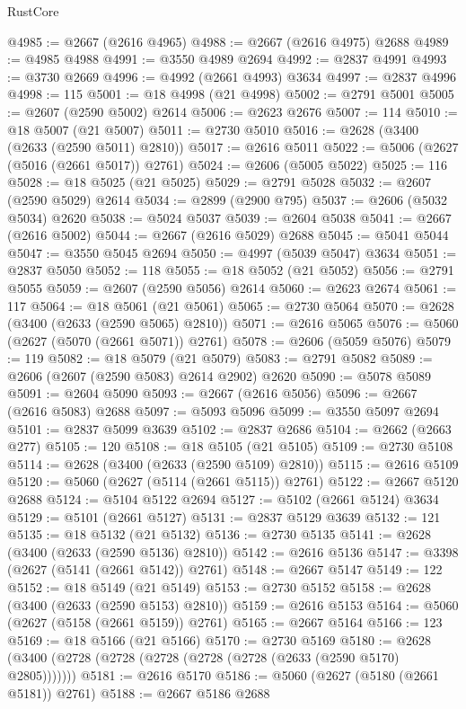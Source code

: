 \begin{lexlean}{RustCore}
\begin{coremodule}
@4985 := @2667 (@2616 @4965)
@4988 := @2667 (@2616 @4975) @2688
@4989 := @4985 @4988
@4991 := @3550 @4989 @2694
@4992 := @2837 @4991
@4993 := @3730 @2669
@4996 := @4992 (@2661 @4993) @3634
@4997 := @2837 @4996
@4998 := 115
@5001 := @18 @4998 (@21 @4998)
@5002 := @2791 @5001
@5005 := @2607 (@2590 @5002) @2614
@5006 := @2623 @2676
@5007 := 114
@5010 := @18 @5007 (@21 @5007)
@5011 := @2730 @5010
@5016 := @2628 (@3400 (@2633 (@2590 @5011) @2810))
@5017 := @2616 @5011
@5022 := @5006 (@2627 (@5016 (@2661 @5017)) @2761)
@5024 := @2606 (@5005 @5022)
@5025 := 116
@5028 := @18 @5025 (@21 @5025)
@5029 := @2791 @5028
@5032 := @2607 (@2590 @5029) @2614
@5034 := @2899 (@2900 @795)
@5037 := @2606 (@5032 @5034) @2620
@5038 := @5024 @5037
@5039 := @2604 @5038
@5041 := @2667 (@2616 @5002)
@5044 := @2667 (@2616 @5029) @2688
@5045 := @5041 @5044
@5047 := @3550 @5045 @2694
@5050 := @4997 (@5039 @5047) @3634
@5051 := @2837 @5050
@5052 := 118
@5055 := @18 @5052 (@21 @5052)
@5056 := @2791 @5055
@5059 := @2607 (@2590 @5056) @2614
@5060 := @2623 @2674
@5061 := 117
@5064 := @18 @5061 (@21 @5061)
@5065 := @2730 @5064
@5070 := @2628 (@3400 (@2633 (@2590 @5065) @2810))
@5071 := @2616 @5065
@5076 := @5060 (@2627 (@5070 (@2661 @5071)) @2761)
@5078 := @2606 (@5059 @5076)
@5079 := 119
@5082 := @18 @5079 (@21 @5079)
@5083 := @2791 @5082
@5089 := @2606 (@2607 (@2590 @5083) @2614 @2902) @2620
@5090 := @5078 @5089
@5091 := @2604 @5090
@5093 := @2667 (@2616 @5056)
@5096 := @2667 (@2616 @5083) @2688
@5097 := @5093 @5096
@5099 := @3550 @5097 @2694
@5101 := @2837 @5099 @3639
@5102 := @2837 @2686
@5104 := @2662 (@2663 @277)
@5105 := 120
@5108 := @18 @5105 (@21 @5105)
@5109 := @2730 @5108
@5114 := @2628 (@3400 (@2633 (@2590 @5109) @2810))
@5115 := @2616 @5109
@5120 := @5060 (@2627 (@5114 (@2661 @5115)) @2761)
@5122 := @2667 @5120 @2688
@5124 := @5104 @5122 @2694
@5127 := @5102 (@2661 @5124) @3634
@5129 := @5101 (@2661 @5127)
@5131 := @2837 @5129 @3639
@5132 := 121
@5135 := @18 @5132 (@21 @5132)
@5136 := @2730 @5135
@5141 := @2628 (@3400 (@2633 (@2590 @5136) @2810))
@5142 := @2616 @5136
@5147 := @3398 (@2627 (@5141 (@2661 @5142)) @2761)
@5148 := @2667 @5147
@5149 := 122
@5152 := @18 @5149 (@21 @5149)
@5153 := @2730 @5152
@5158 := @2628 (@3400 (@2633 (@2590 @5153) @2810))
@5159 := @2616 @5153
@5164 := @5060 (@2627 (@5158 (@2661 @5159)) @2761)
@5165 := @2667 @5164
@5166 := 123
@5169 := @18 @5166 (@21 @5166)
@5170 := @2730 @5169
@5180 := @2628 (@3400 (@2728 (@2728 (@2728 (@2728 (@2728 (@2633 (@2590 @5170) @2805)))))))
@5181 := @2616 @5170
@5186 := @5060 (@2627 (@5180 (@2661 @5181)) @2761)
@5188 := @2667 @5186 @2688

\end{coremodule}
\end{lexlean}
